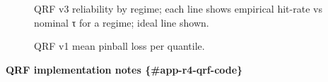 \documentclass[
  a4paper,
  DIV=11,
  numbers=noendperiod]{scrreprt}
\begin{document}
\begin{figure}


\caption{\label{fig-qrf-v3-reliability-by-regime}QRF v3 reliability by
regime; each line shows empirical hit-rate vs nominal τ for a regime;
ideal line shown.}

\end{figure}%

\begin{figure}


\caption{\label{fig-qrf-v1-pinball-mean}QRF v1 mean pinball loss per
quantile.}

\end{figure}%

\textbf{QRF implementation notes \{\#app-r4-qrf-code\}}
\end{document}
